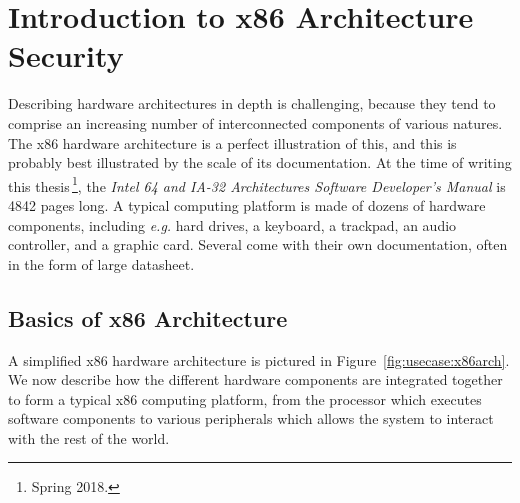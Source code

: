 \section{Introduction to x86 Architecture Security}
\label{sec:usecase:architecture}

Describing hardware architectures in depth is challenging, because they tend to
comprise an increasing number of interconnected components of various natures.
%
The x86 hardware architecture is a perfect illustration of this, and this  is
probably best illustrated by the scale of its documentation.
%
At the time of writing this thesis\,\footnote{Spring 2018.}, the \emph{Intel 64
  and IA-32 Architectures Software Developer’s Manual} is 4842 pages long.
%
A typical computing platform is made of dozens of hardware components, including
\emph{e.g.} hard drives, a keyboard, a trackpad, an audio controller, and a
graphic card.
%
Several come with their own documentation, often in the form of large datasheet.


\subsection{Basics of x86 Architecture}

A simplified x86 hardware architecture is pictured in
Figure~\ref{fig:usecase:x86arch}. 
%
We now describe how the different hardware components are integrated together to
form a typical x86 computing platform, from the processor which executes
software components to various peripherals which allows the system to interact
with the rest of the world.

